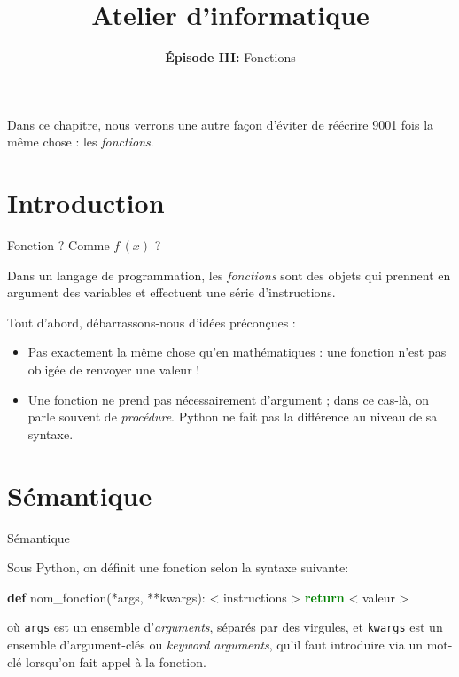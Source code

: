\documentclass[10pt]{beamer}
\title{Atelier d'informatique}
\subtitle{\textbf{Épisode III:} Fonctions}
\begin{document}
\begin{frame}
\titlepage
\pause

Dans ce chapitre, nous verrons une autre façon d'éviter de réécrire 9001 fois la même chose : les \textit{fonctions}.
\end{frame}

\frame{\tableofcontents}

\section{Introduction}

\begin{frame}{Fonction ? Comme $f\,(x)$ ?}

Dans un langage de programmation, les \textit{fonctions} sont des objets qui prennent en argument des variables et effectuent une série d'instructions.
\pause
\vspace{1em}

Tout d'abord, débarrassons-nous d'idées préconçues :
\pause

\begin{itemize}[<+->]
\item Pas exactement la même chose qu'en mathématiques : une fonction n'est pas obligée de renvoyer une valeur !
\item Une fonction ne prend pas nécessairement d'argument ; dans ce cas-là, on parle souvent de \textit{procédure}. Python ne fait pas la différence au niveau de sa syntaxe.
\end{itemize}

\end{frame}

\section{Sémantique}

\begin{frame}[fragile]{Sémantique}

Sous Python, on définit une fonction selon la syntaxe suivante:\pause
\begin{semiverbatim}\textbf{def} nom_fonction(*args, **kwargs):
    < instructions >
    \textcolor{green}{\textbf{return}} < valeur >\end{semiverbatim}
\pause
où \verb|args| est un ensemble d'\textit{arguments}, séparés par des virgules, et \verb|kwargs| est un ensemble d'argument-clés ou \textit{keyword arguments}, qu'il faut introduire via un mot-clé lorsqu'on fait appel à la fonction.
\end{frame}
\end{document}
